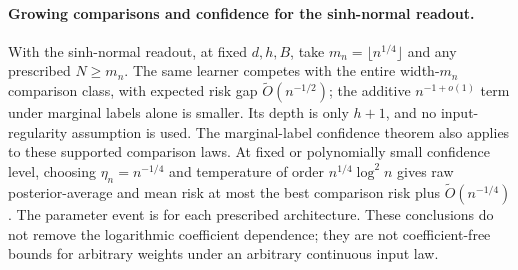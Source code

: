 \paragraph{Growing comparisons and confidence for the sinh-normal readout.}
With the sinh-normal readout, at fixed $d,h,B$, take $m_n=\lfloor n^{1/4}\rfloor$ and any prescribed
$N\ge m_n$. The same learner competes with the entire width-$m_n$
comparison class, with expected risk gap $\widetilde O(n^{-1/2})$;
the additive $n^{-1+o(1)}$ term under marginal labels alone is smaller.
Its depth is only $h+1$, and no input-regularity assumption is used.
The marginal-label confidence theorem also applies to these supported
comparison laws. At fixed or polynomially small confidence level,
choosing $\eta_n=n^{-1/4}$ and temperature of order
$n^{1/4}\log^2 n$ gives raw posterior-average and mean risk at most
the best comparison risk plus $\widetilde O(n^{-1/4})$.
The parameter event is for each prescribed architecture. These
conclusions do not remove the logarithmic coefficient dependence;
they are not coefficient-free bounds for arbitrary weights under an
arbitrary continuous input law.
